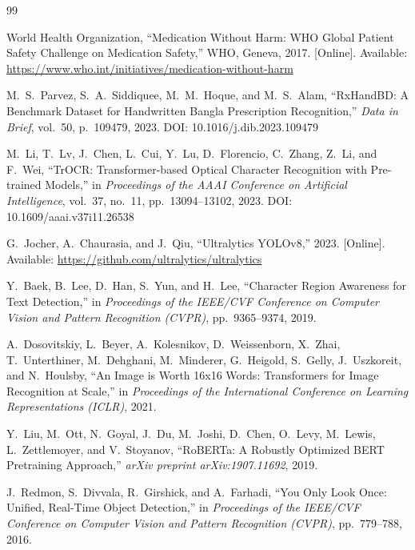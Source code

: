 \documentclass[12pt,a4paper,oneside]{report}
\begin{document}
\begin{thebibliography}{99}

World Health Organization, ``Medication Without Harm: WHO Global Patient Safety Challenge on Medication Safety,'' WHO, Geneva, 2017. [Online]. Available: \url{https://www.who.int/initiatives/medication-without-harm}

M.~S.~Parvez, S.~A.~Siddiquee, M.~M.~Hoque, and M.~S.~Alam, ``RxHandBD: A Benchmark Dataset for Handwritten Bangla Prescription Recognition,'' \textit{Data in Brief}, vol.~50, p.~109479, 2023. DOI: 10.1016/j.dib.2023.109479

M.~Li, T.~Lv, J.~Chen, L.~Cui, Y.~Lu, D.~Florencio, C.~Zhang, Z.~Li, and F.~Wei, ``TrOCR: Transformer-based Optical Character Recognition with Pre-trained Models,'' in \textit{Proceedings of the AAAI Conference on Artificial Intelligence}, vol.~37, no.~11, pp.~13094--13102, 2023. DOI: 10.1609/aaai.v37i11.26538

G.~Jocher, A.~Chaurasia, and J.~Qiu, ``Ultralytics YOLOv8,'' 2023. [Online]. Available: \url{https://github.com/ultralytics/ultralytics}

Y.~Baek, B.~Lee, D.~Han, S.~Yun, and H.~Lee, ``Character Region Awareness for Text Detection,'' in \textit{Proceedings of the IEEE/CVF Conference on Computer Vision and Pattern Recognition (CVPR)}, pp.~9365--9374, 2019.

A.~Dosovitskiy, L.~Beyer, A.~Kolesnikov, D.~Weissenborn, X.~Zhai, T.~Unterthiner, M.~Dehghani, M.~Minderer, G.~Heigold, S.~Gelly, J.~Uszkoreit, and N.~Houlsby, ``An Image is Worth 16x16 Words: Transformers for Image Recognition at Scale,'' in \textit{Proceedings of the International Conference on Learning Representations (ICLR)}, 2021.

Y.~Liu, M.~Ott, N.~Goyal, J.~Du, M.~Joshi, D.~Chen, O.~Levy, M.~Lewis, L.~Zettlemoyer, and V.~Stoyanov, ``RoBERTa: A Robustly Optimized BERT Pretraining Approach,'' \textit{arXiv preprint arXiv:1907.11692}, 2019.

J.~Redmon, S.~Divvala, R.~Girshick, and A.~Farhadi, ``You Only Look Once: Unified, Real-Time Object Detection,'' in \textit{Proceedings of the IEEE/CVF Conference on Computer Vision and Pattern Recognition (CVPR)}, pp.~779--788, 2016.


\end{thebibliography}
\end{document}
